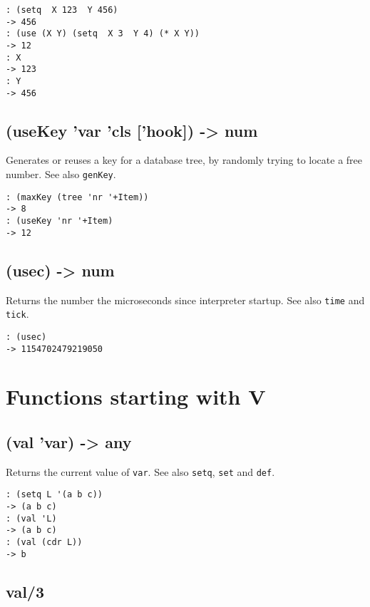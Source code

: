 {{{{{{{{\begin{verbatim}
: (setq  X 123  Y 456)
-> 456
: (use (X Y) (setq  X 3  Y 4) (* X Y))
-> 12
: X
-> 123
: Y
-> 456
\end{verbatim}

 
\section{(useKey 'var 'cls ['hook]) -> num}
\label{sec-8-1-21-20}


Generates or reuses a key for a database tree, by randomly trying to
locate a free number. See also \texttt{genKey}.


\begin{verbatim}
: (maxKey (tree 'nr '+Item))
-> 8
: (useKey 'nr '+Item)
-> 12
\end{verbatim}

 
\section{(usec) -> num}
\label{sec-8-1-21-21}


Returns the number the microseconds since interpreter startup. See also
\texttt{time} and \texttt{tick}.


\begin{verbatim}
: (usec)
-> 1154702479219050
\end{verbatim}


\chapter{Functions starting with V}
\label{sec-8-1-22}


 
\section{(val 'var) -> any}
\label{sec-8-1-22-1}


Returns the current value of \texttt{var}. See also \texttt{setq}, \texttt{set} and \texttt{def}.


\begin{verbatim}
: (setq L '(a b c))
-> (a b c)
: (val 'L)
-> (a b c)
: (val (cdr L))
-> b
\end{verbatim}

 
\section{val/3}
\label{sec-8-1-22-2}


}}}}}}}}

